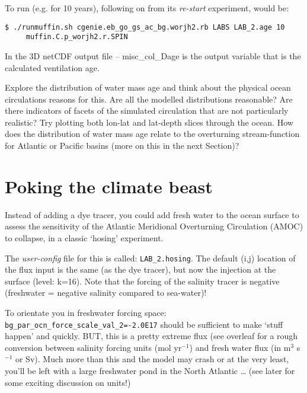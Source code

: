 To run (e.g. for 10 years), following on from its \textit{re-start} experiment, would be:

\vspace{-1mm}\small
\begin{verbatim}
$ ./runmuffin.sh cgenie.eb_go_gs_ac_bg.worjh2.rb LABS LAB_2.age 10
     muffin.C.p_worjh2.r.SPIN
\end{verbatim}
\normalsize\vspace{-1mm}

In the 3D netCDF output file -- \textsf{\footnotesize misc\_col\_Dage} is the output variable that is the calculated ventilation age.

Explore the distribution of water mass age and think about the physical ocean circulations reasons for this. Are all the modelled distributions reasonable? Are there indicators of facets of the simulated circulation that are not particularly realistic? Try plotting both lon-lat and lat-depth slices through the ocean. How does the distribution of water mass age relate to the overturning stream-function for Atlantic or Pacific basins (more on this in the next Section)?

\newpage

\section{Poking the climate beast}

Instead of adding a dye tracer, you could add fresh water to the ocean surface to assess the sensitivity of the Atlantic Meridional Overturning Circulation (AMOC) to collapse, in a classic ‘hosing’ experiment.

The \textit{user-config} file for this is called: \texttt{LAB\_2.hosing}. The default (i,j) location of the flux input is the same (as the dye tracer), but now the injection at the surface (level: k=16). Note that the forcing of the salinity tracer is negative (freshwater = negative salinity compared to sea-water)!

To orientate you in freshwater forcing space: \texttt{bg\_par\_ocn\_force\_scale\_val\_2=-2.0E17} should be sufficient to make ‘stuff happen’ and quickly. BUT, this is a pretty extreme flux (see overleaf for a rough conversion between salinity forcing units (mol yr$^{-1}$) and fresh water flux (in m$^{3}$ s$^{-1}$ or Sv). Much more than this and the model may crash or at the very least, you’ll be left with a large freshwater pond in the North Atlantic … (see later for some exciting discussion on units!)


